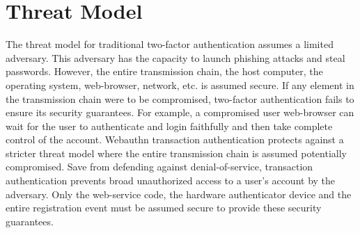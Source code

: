 
\section{Threat Model}


The threat model for traditional two-factor authentication assumes a limited adversary. This adversary has the capacity to launch phishing attacks and steal passwords. However, the entire transmission chain, the host computer, the operating system, web-browser, network, etc. is assumed secure. If any element in the transmission chain were to be compromised, two-factor authentication fails to ensure its security guarantees. For example, a compromised user web-browser can wait for the user to authenticate and login faithfully and then take complete control of the account. Webauthn transaction authentication protects against a stricter threat model where the entire transmission chain is assumed potentially compromised. Save from defending against denial-of-service, transaction authentication prevents broad unauthorized access to a user's account by the adversary. Only the web-service code, the hardware authenticator device and the entire registration event must be assumed secure to provide these security guarantees.




